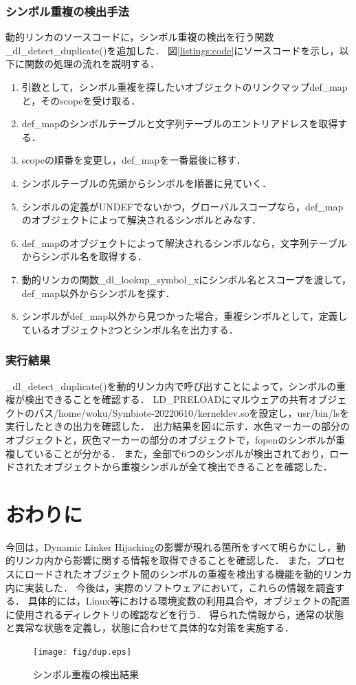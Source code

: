 \documentclass[submit,techreq,noauthor]{eco}	%
\begin{document}
\subsubsection{シンボル重複の検出手法}
動的リンカのソースコードに，シンボル重複の検出を行う関数 \_dl\_detect\_duplicate()を追加した．
図\ref{listings:code}にソースコードを示し，以下に関数の処理の流れを説明する．

\begin{enumerate}
  \item 引数として，シンボル重複を探したいオブジェクトのリンクマップdef\_mapと，そのscopeを受け取る．
  \item def\_mapのシンボルテーブルと文字列テーブルのエントリアドレスを取得する．
  \item scopeの順番を変更し，def\_mapを一番最後に移す．
  \item シンボルテーブルの先頭からシンボルを順番に見ていく．
  \item シンボルの定義がUNDEFでないかつ，グローバルスコープなら，def\_mapのオブジェクトによって解決されるシンボルとみなす．
  \item def\_mapのオブジェクトによって解決されるシンボルなら，文字列テーブルからシンボル名を取得する．
  \item 動的リンカの関数\_dl\_lookup\_symbol\_xにシンボル名とスコープを渡して，def\_map以外からシンボルを探す．
  \item シンボルがdef\_map以外から見つかった場合，重複シンボルとして，定義しているオブジェクト2つとシンボル名を出力する．\\
\end{enumerate}

\subsubsection{実行結果}
\_dl\_detect\_duplicate()を動的リンカ内で呼び出すことによって，シンボルの重複が検出できることを確認する．
LD\_PRELOADにマルウェアの共有オブジェクトのパス/home/woku/Symbiote-20220610/kerneldev.soを設定し，usr/bin/lsを実行したときの出力を確認した．
出力結果を図4に示す．水色マーカーの部分のオブジェクトと，灰色マーカーの部分のオブジェクトで，fopenのシンボルが重複していることが分かる．
また，全部で6つのシンボルが検出されており，ロードされたオブジェクトから重複シンボルが全て検出できることを確認した．\\


\section{おわりに}
今回は，Dynamic Linker Hijackingの影響が現れる箇所をすべて明らかにし，動的リンカ内から影響に関する情報を取得できることを確認した．
また，プロセスにロードされたオブジェクト間のシンボルの重複を検出する機能を動的リンカ内に実装した．
今後は，実際のソフトウェアにおいて，これらの情報を調査する．
具体的には，Linux等における環境変数の利用具合や，オブジェクトの配置に使用されるディレクトリの確認などを行う．
得られた情報から，通常の状態と異常な状態を定義し，状態に合わせて具体的な対策を実施する．


\begin{figure}[t]
	\centering
  \texttt{[image: fig/dup.eps]}
	\caption{シンボル重複の検出結果}
	\label{fig:duplicate}
\end{figure}



\setlength\baselineskip{12pt}
{\small
	
	
}
\end{document}
